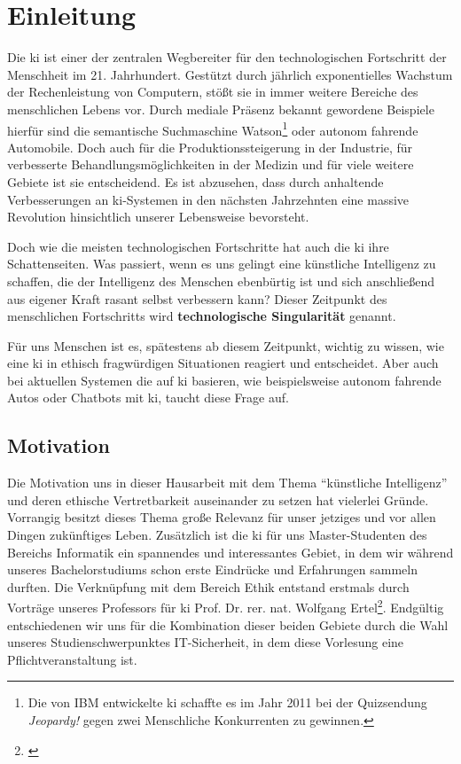 \section{Einleitung}
Die \ac{ki} ist einer der zentralen Wegbereiter für den technologischen Fortschritt der Menschheit im 21. Jahrhundert.
Gestützt durch jährlich exponentielles Wachstum der Rechenleistung von Computern, stößt sie in immer weitere Bereiche des menschlichen Lebens vor.
Durch mediale Präsenz bekannt gewordene Beispiele hierfür sind die semantische Suchmaschine Watson\footnote{Die von IBM entwickelte \ac{ki} schaffte es im Jahr 2011 bei der Quizsendung \textit{Jeopardy!} gegen zwei Menschliche Konkurrenten zu gewinnen.} oder autonom fahrende Automobile. %
Doch auch für die Produktionssteigerung in der Industrie, für verbesserte Behandlungsmöglichkeiten in der Medizin und für viele weitere Gebiete ist sie entscheidend.
Es ist abzusehen, dass durch anhaltende Verbesserungen an \ac{ki}-Systemen in den nächsten Jahrzehnten eine massive Revolution hinsichtlich unserer Lebensweise bevorsteht.

Doch wie die meisten technologischen Fortschritte hat auch die \ac{ki} ihre Schattenseiten.
Was passiert, wenn es uns gelingt eine künstliche Intelligenz zu schaffen, die der Intelligenz des Menschen ebenbürtig ist und sich anschließend aus eigener Kraft rasant selbst verbessern kann?
Dieser Zeitpunkt des menschlichen Fortschritts wird \textbf{technologische Singularität} genannt.

Für uns Menschen ist es, spätestens ab diesem Zeitpunkt, wichtig zu wissen, wie eine \ac{ki} in ethisch fragwürdigen Situationen reagiert und entscheidet. Aber auch bei aktuellen Systemen die auf \ac{ki} basieren, wie beispielsweise autonom fahrende Autos oder Chatbots mit \ac{ki}, taucht diese Frage auf. 

\subsection{Motivation}
Die Motivation uns in dieser Hausarbeit mit dem Thema \enquote{künstliche Intelligenz} und deren ethische Vertretbarkeit auseinander zu setzen hat vielerlei Gründe. 
Vorrangig besitzt dieses Thema große Relevanz für unser jetziges und vor allen Dingen zukünftiges Leben. 
Zusätzlich ist die \ac{ki} für uns Master-Studenten des Bereichs Informatik ein spannendes und interessantes Gebiet, in dem wir während unseres Bachelorstudiums schon erste Eindrücke und Erfahrungen sammeln durften.
Die Verknüpfung mit dem Bereich Ethik entstand erstmals durch Vorträge unseres Professors für \ac{ki} Prof. Dr. rer. nat. Wolfgang Ertel\footnote{\cite{ProfessorErtel}}. Endgültig entschiedenen wir uns für die Kombination dieser beiden Gebiete durch die Wahl unseres Studienschwerpunktes IT-Sicherheit, in dem diese Vorlesung eine Pflichtveranstaltung ist.

